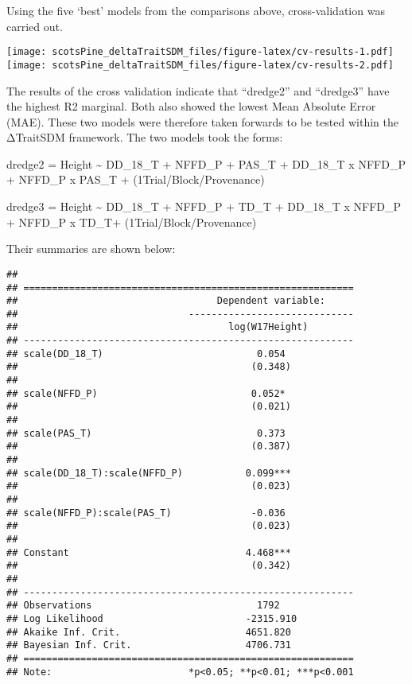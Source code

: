 \documentclass[]{article}
\begin{document}
Using the five `best' models from the comparisons above,
cross-validation was carried out.

\texttt{[image: scotsPine\_deltaTraitSDM\_files/figure-latex/cv-results-1.pdf]}
\texttt{[image: scotsPine\_deltaTraitSDM\_files/figure-latex/cv-results-2.pdf]}

The results of the cross validation indicate that ``dredge2'' and
``dredge3'' have the highest R2 marginal. Both also showed the lowest
Mean Absolute Error (MAE). These two models were therefore taken
forwards to be tested within the ΔTraitSDM framework. The two models
took the forms:

dredge2 = Height \textasciitilde{} DD\_18\_T + NFFD\_P + PAS\_T +
DD\_18\_T x NFFD\_P + NFFD\_P x PAS\_T +
(1\textbar{}Trial/Block/Provenance)

dredge3 = Height \textasciitilde{} DD\_18\_T + NFFD\_P + TD\_T +
DD\_18\_T x NFFD\_P + NFFD\_P x TD\_T+
(1\textbar{}Trial/Block/Provenance)

Their summaries are shown below:

\begin{verbatim}
## 
## ==========================================================
##                                   Dependent variable:     
##                              -----------------------------
##                                     log(W17Height)        
## ----------------------------------------------------------
## scale(DD_18_T)                           0.054            
##                                         (0.348)           
##                                                           
## scale(NFFD_P)                           0.052*            
##                                         (0.021)           
##                                                           
## scale(PAS_T)                             0.373            
##                                         (0.387)           
##                                                           
## scale(DD_18_T):scale(NFFD_P)           0.099***           
##                                         (0.023)           
##                                                           
## scale(NFFD_P):scale(PAS_T)              -0.036            
##                                         (0.023)           
##                                                           
## Constant                               4.468***           
##                                         (0.342)           
##                                                           
## ----------------------------------------------------------
## Observations                             1792             
## Log Likelihood                         -2315.910          
## Akaike Inf. Crit.                      4651.820           
## Bayesian Inf. Crit.                    4706.731           
## ==========================================================
## Note:                        *p<0.05; **p<0.01; ***p<0.001
\end{verbatim}
\end{document}
